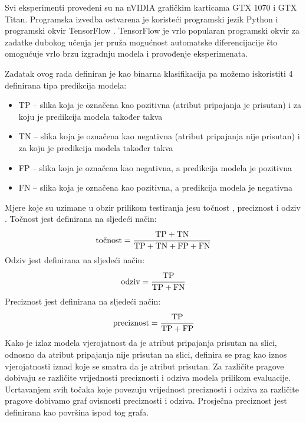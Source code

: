 \documentclass[times, utf8, diplomski, numeric]{fer}
\begin{document}
Svi eksperimenti provedeni su na nVIDIA grafičkim karticama GTX 1070 i GTX Titan. 
Programska izvedba ostvarena je koristeći programski jezik Python i programski okvir TensorFlow \citep{framework:tensorflow}.
TensorFlow je vrlo popularan programski okvir za zadatke dubokog učenja jer pruža mogućnost automatske diferencijacije što omogućuje vrlo brzu izgradnju modela i provođenje eksperimenata.

Zadatak ovog rada definiran je kao binarna klasifikacija pa možemo iskoristiti 4 definirana tipa predikcija modela: 
\begin{itemize}
 \item TP  -- slika koja je označena kao pozitivna (atribut pripajanja je prisutan) i za koju je predikcija modela također takva 
 \item TN  -- slika koja je označena kao negativna (atribut pripajanja nije prisutan) i za koju je predikcija modela također takva
 \item FP  -- slika koja je označena kao negativna, a predikcija modela je pozitivna
 \item FN  -- slika koja je označena kao pozitivna, a predikcija modela je negativna
\end{itemize}
Mjere koje su uzimane u obzir prilikom testiranja jesu točnost , preciznost  i odziv . 
Točnost jest definirana na sljedeći način:
\begin{align}
 \text{točnost} = \cfrac{\text{TP} + \text{TN}}{\text{TP} + \text{TN} + \text{FP} + \text{FN}}
\end{align}
Odziv jest definirana na sljedeći način:
\begin{align}
 \text{odziv} = \cfrac{\text{TP}}{\text{TP} + \text{FN}}
\end{align}
Preciznost jest definirana na sljedeći način:
\begin{align}
 \text{preciznost} = \cfrac{\text{TP}}{\text{TP} + \text{FP}}
\end{align}
Kako je izlaz modela vjerojatnost da je atribut pripajanja prisutan na slici, odnosno da atribut pripajanja nije prisutan na slici, definira se prag kao iznos vjerojatnosti iznad koje se smatra da je atribut prisutan.
Za različite pragove dobivaju se različite vrijednosti preciznosti i odziva modela prilikom evaluacije. 
Ucrtavanjem svih točaka koje povezuju vrijednost preciznosti i odziva za različite pragove dobivamo graf ovisnosti preciznosti i odziva.
Prosječna preciznost jest definirana kao površina ispod tog grafa.
\end{document}
